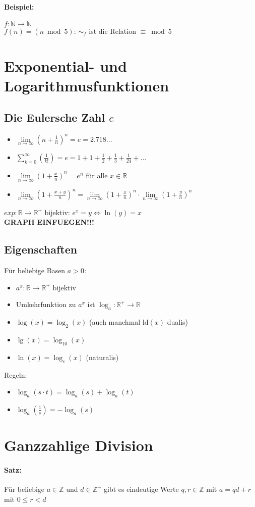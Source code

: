 \paragraph{Beispiel:}$f:\mathbb{N}\rightarrow\mathbb{N}$\\
$f(n)=(n \bmod 5)$: $\sim_f$ ist die Relation $\equiv \bmod 5$

\section{Exponential- und Logarithmusfunktionen}
\subsection{Die Eulersche Zahl $e$}
\begin{itemize}
\item $\lim\limits_{n \to \infty}\left(n+\frac{1}{n}\right)^n=e=2.718\ldots$
\item $\sum\limits_{k=0}^{\infty}\left(\frac{1}{k!}\right)=e=1+1+\frac{1}{2}+\frac{1}{3}+\frac{1}{24}+\ldots$
\item $\lim\limits_{n\to\infty}\left(1+\frac{x}{n}\right)^n=e^n$ für alle $x\in\mathbb{R}$
\item $\lim\limits_{n\to\infty}\left(1+\frac{x+y}{n}\right)^n=\lim\limits_{n\to\infty}\left(1+\frac{x}{n}\right)^n \cdot \lim\limits_{n\to\infty}\left(1+\frac{y}{n}\right)^n$
\end{itemize}
$exp: \mathbb{R}\to	\mathbb{R}^+$ bijektiv:
$e^x=y \Leftrightarrow \ln(y)=x$\\
\textbf{GRAPH EINFUEGEN!!!}

\subsection{Eigenschaften}
Für beliebige Basen $a>0$:
\begin{itemize}
\item $a^x:\mathbb{R}\to\mathbb{R}^+$ bijektiv
\item Umkehrfunktion zu $a^x$ ist $\log_a:\mathbb{R}^+\to\mathbb{R}$
\item $\log(x)=\log_2(x)$ (auch manchmal $\text{ld}(x)$ \glq dualis\grq )
\item $\lg(x)=\log_{10}(x)$
\item $\ln(x)=\log_e(x)$ (\glq naturalis\grq )
\end{itemize}
Regeln:
\begin{itemize}
\item $\log_a(s\cdot t) = \log_a(s) + \log_a(t)$
\item $\log_a\left(\frac{1}{s}\right)=-\log_a(s)$
\end{itemize}

\section{Ganzzahlige Division}
\paragraph{Satz:}Für beliebige $a\in\mathbb{Z}$ und $d\in\mathbb{Z}^+$ gibt es eindeutige Werte $q,r\in\mathbb{Z}$ mit $a=qd+r$ mit $0\leq r<d$
%